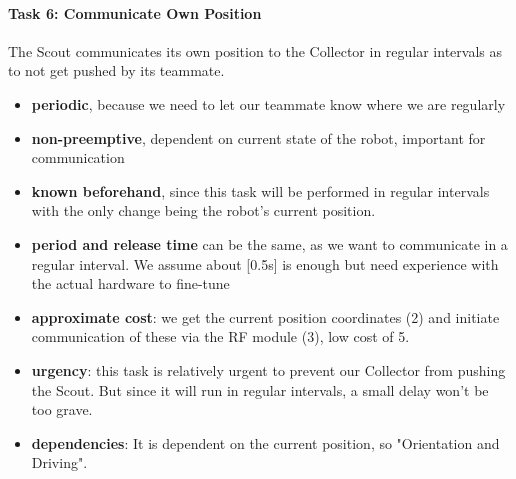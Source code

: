 \documentclass[12pt]{article}
\begin{document}
\paragraph{Task 6: Communicate Own Position}
The Scout communicates its own position to the Collector in regular intervals as to not get pushed by its teammate.
\begin{itemize}
	\item \textbf{periodic}, because we need to let our teammate know where we are regularly
	\item \textbf{non-preemptive}, dependent on current state of the robot, important for communication
	\item \textbf{known beforehand}, since this task will be performed in regular intervals with the only change being the robot's current position.
	\item \textbf{period and release time} can be the same, as we want to communicate in a regular interval. We assume about [0.5s] is enough but need experience with the actual hardware to fine-tune
	\item \textbf{approximate cost}: we get the current position coordinates (2) and initiate communication of these via the RF module (3), low cost of 5.
	\item \textbf{urgency}: this task is relatively urgent to prevent our Collector from pushing the Scout. But since it will run in regular intervals, a small delay won't be too grave.
	\item \textbf{dependencies}: It is dependent on the current position, so "Orientation and Driving".
\end{itemize}
\end{document}
